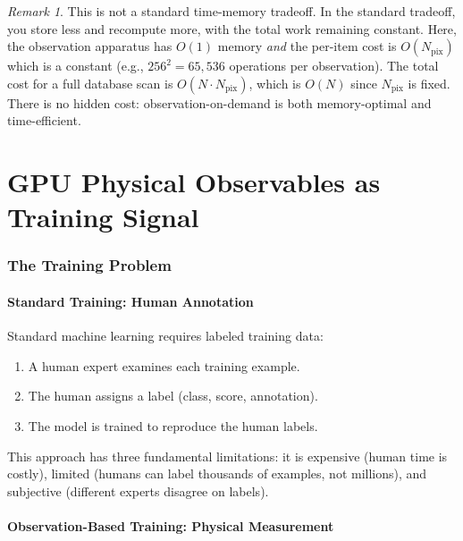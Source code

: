 \documentclass[11pt,twocolumn,a4paper]{article}
\theoremstyle{definition}
\theoremstyle{remark}
\newtheorem{remark}[theorem]{Remark}
\newcommand{\Npix}{N_{\mathrm{pix}}}
\begin{document}
\begin{remark}
This is not a standard time-memory tradeoff. In the standard tradeoff, you store less and recompute more, with the total work remaining constant. Here, the observation apparatus has $O(1)$ memory \emph{and} the per-item cost is $O(\Npix)$ which is a constant (e.g., $256^2 = 65{,}536$ operations per observation). The total cost for a full database scan is $O(N \cdot \Npix)$, which is $O(N)$ since $\Npix$ is fixed. There is no hidden cost: observation-on-demand is both memory-optimal and time-efficient.
\end{remark}



\part{GPU Physical Observables as Training Signal}

\section{The Training Problem}
\label{sec:training_problem}

\subsection{Standard Training: Human Annotation}

Standard machine learning requires labeled training data:
\begin{enumerate}[nosep]
\item A human expert examines each training example.
\item The human assigns a label (class, score, annotation).
\item The model is trained to reproduce the human labels.
\end{enumerate}
This approach has three fundamental limitations: it is expensive (human time is costly), limited (humans can label thousands of examples, not millions), and subjective (different experts disagree on labels).

\subsection{Observation-Based Training: Physical Measurement}
\end{document}
